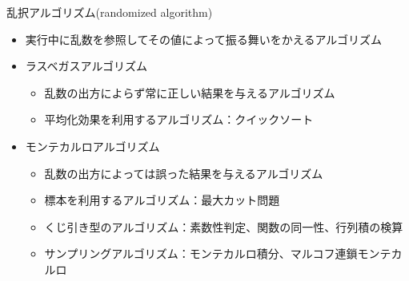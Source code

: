 \begin{frame}[t,fragile]{乱択アルゴリズム(randomized algorithm)}
  \begin{itemize}
    \setlength{\itemsep}{1em}
  \item 実行中に乱数を参照してその値によって振る舞いをかえるアルゴリズム
  \item ラスベガスアルゴリズム
    \begin{itemize}
    \item 乱数の出方によらず常に正しい結果を与えるアルゴリズム
    \item 平均化効果を利用するアルゴリズム：クイックソート
    \end{itemize}
  \item モンテカルロアルゴリズム
    \begin{itemize}
    \item 乱数の出方によっては誤った結果を与えるアルゴリズム
    \item 標本を利用するアルゴリズム：最大カット問題
    \item くじ引き型のアルゴリズム：素数性判定、関数の同一性、行列積の検算
    \item サンプリングアルゴリズム：モンテカルロ積分、マルコフ連鎖モンテカルロ
    \end{itemize}
  \end{itemize}
\end{frame}
